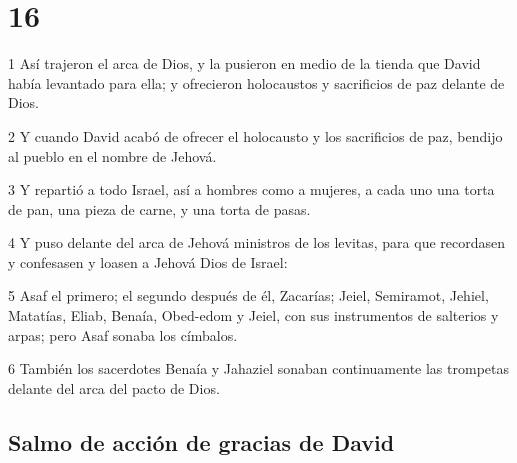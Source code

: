 \chapter{16}

\par 1 Así trajeron el arca de Dios, y la pusieron en medio de la tienda que David había levantado para ella; y ofrecieron holocaustos y sacrificios de paz delante de Dios.
\par 2 Y cuando David acabó de ofrecer el holocausto y los sacrificios de paz, bendijo al pueblo en el nombre de Jehová.
\par 3 Y repartió a todo Israel, así a hombres como a mujeres, a cada uno una torta de pan, una pieza de carne, y una torta de pasas.
\par 4 Y puso delante del arca de Jehová ministros de los levitas, para que recordasen y confesasen y loasen a Jehová Dios de Israel:
\par 5 Asaf el primero; el segundo después de él, Zacarías; Jeiel, Semiramot, Jehiel, Matatías, Eliab, Benaía, Obed-edom y Jeiel, con sus instrumentos de salterios y arpas; pero Asaf sonaba los címbalos.
\par 6 También los sacerdotes Benaía y Jahaziel sonaban continuamente las trompetas delante del arca del pacto de Dios.

\section*{Salmo de acción de gracias de David}

